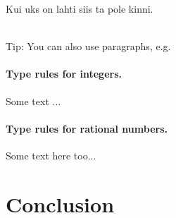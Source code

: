 \begin{loba}
Kui uks on lahti siis ta pole kinni.
\end{loba}
\\
Tip: You can also use paragraphs, e.g.

\paragraph{Type rules for integers.} Some text ...

\paragraph{Type rules for rational numbers.} Some text here too...


\clearpage
\section{Conclusion}





